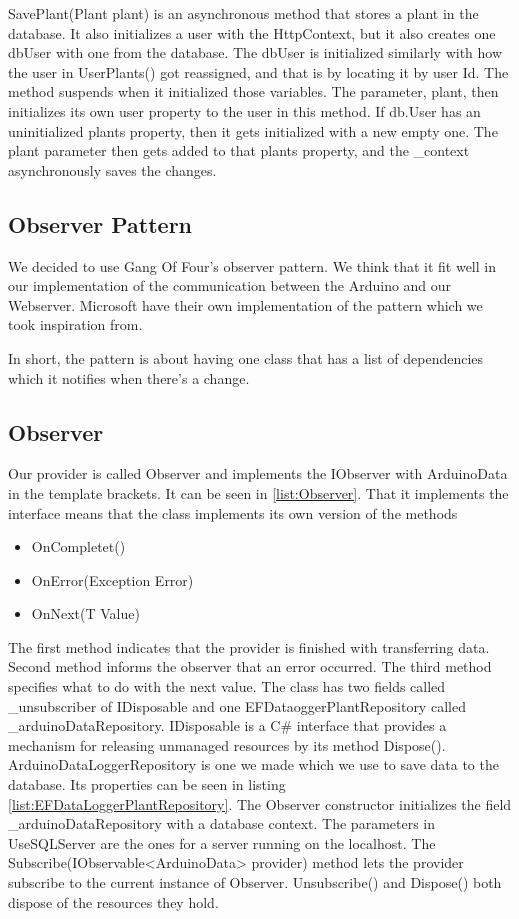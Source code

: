 \documentclass[a4paper,12pt,oneside,openright,titlepage]{book}
\begin{document}
SavePlant(Plant plant) is an asynchronous method that stores a plant in the database.  It also initializes a user with the HttpContext, but it also creates one dbUser with one from the database. The dbUser is initialized similarly with how the user in UserPlants() got reassigned, and that is by locating it by user Id. The method suspends when it initialized those variables. The parameter, plant, then initializes its own user property to the user in this method. If db.User has an uninitialized plants property, then it gets initialized with a new empty one. The plant parameter then gets added to that plants property, and the \_context asynchronously saves the changes.
  
\subsection{Observer Pattern}
We decided to use Gang Of Four's observer pattern\cite{GoF}. We think that it fit well in our implementation of the communication between the Arduino and our Webserver. Microsoft have their own implementation of the pattern\cite{MicrosoftObserver} which we took inspiration from.
 
In short, the pattern is about having one class that has a list of dependencies which it notifies when there's a change.

\subsection{Observer}
Our provider is called Observer and implements the IObserver with ArduinoData in the template brackets. It can be seen in \ref{list:Observer}. That it implements the interface means that the class implements its own version of the methods
\begin{itemize}
\item OnCompletet()
\item OnError(Exception Error)
\item OnNext(T Value)
\end{itemize}

The first method indicates that the provider is finished with transferring data. Second method informs the observer that an error occurred. The third method specifies what to do with the next value.
The class has two fields called \_unsubscriber of IDisposable and one EFDataoggerPlantRepository called \_arduinoDataRepository. IDisposable is a C\# interface that provides a mechanism for releasing unmanaged resources by its method Dispose(). ArduinoDataLoggerRepository is one we made which we use to save data to the database. Its properties can be seen in listing \ref{list:EFDataLoggerPlantRepository}. The Observer constructor initializes the field \_arduinoDataRepository with a database context. The parameters in UseSQLServer are the ones for a server running on the localhost. The Subscribe(IObservable<ArduinoData> provider) method lets the provider subscribe to the current instance of Observer. Unsubscribe() and Dispose() both dispose of the resources they hold. 
\end{document}
